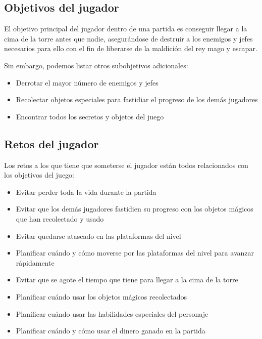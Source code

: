 \subsection{Objetivos del jugador}
El objetivo principal del jugador dentro de una partida es conseguir llegar a la
cima de la torre antes que nadie, asegurándose de destruir a los enemigos y
jefes necesarios para ello con el fin de liberarse de la maldición del rey mago y escapar.

Sin embargo, podemos listar otros subobjetivos adicionales:
\begin{itemize}
    \item Derrotar el mayor número de enemigos y jefes
    \item Recolectar objetos especiales para fastidiar el progreso de los demás
    jugadores
    \item Encontrar todos los secretos y objetos del juego
\end{itemize}

\subsection{Retos del jugador}

Los retos a los que tiene que someterse el jugador están todos relacionados con
los objetivos del juego:
\begin{itemize}
    \item Evitar perder toda la vida durante la partida
    \item Evitar que los demás jugadores fastidien su progreso con los objetos
    mágicos que han recolectado y usado
    \item Evitar quedarse atascado en las plataformas del nivel
    \item Planificar cuándo y cómo moverse por las plataformas del nivel para
    avanzar rápidamente
    \item Evitar que se agote el tiempo que tiene para llegar a la cima de la
    torre
    \item Planificar cuándo usar los objetos mágicos recolectados
    \item Planificar cuándo usar las habilidades especiales del personaje
    \item Planificar cuándo y cómo usar el dinero ganado en la partida
\end{itemize}